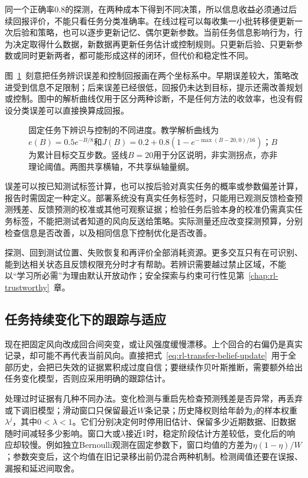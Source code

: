 同一个正确率$0.8$的探测，在两种成本下得到不同决策，所以信息收益必须通过后续回报评价，不能只看任务分类准确率。在线过程可以每收集一小批转移便更新一次后验和策略，也可以逐步更新记忆、偶尔更新参数。当前任务信息影响行为，行为决定取得什么数据，新数据再更新任务估计或控制规则。只更新后验、只更新参数或同时更新两者，都可能形成这样的闭环，但代价和稳定性不同。

图~\ref{fig:rl-transfer-identification-curves}~刻意把任务辨识误差和控制回报画在两个坐标系中。早期误差较大，策略改进受到信息不足限制；后来误差已经很低，回报仍未达到目标，提示还需改善规划或控制。图中的解析曲线仅用于区分两种诊断，不是任何方法的收敛率，也没有假设分类误差可以直接换算成回报。

\begin{figure}[htbp]
 \centering
 
 \caption{固定任务下辨识与控制的不同进度。教学解析曲线为$e(B)=0.5e^{-B/8}$和$J(B)=0.2+0.8(1-e^{-\max(B-20,0)/16})$；$B$为累计目标交互步数。竖线$B=20$用于分区说明，非实测拐点，亦非理论阈值。两图共享横轴，不共享纵轴量纲。}
 \label{fig:rl-transfer-identification-curves}
\end{figure}

误差可以按已知测试标签计算，也可以按后验对真实任务的概率或参数偏差计算，报告时需固定一种定义。部署系统没有真实任务标签时，只能用已观测反馈检查预测残差、反馈预测的校准或其他可观察证据；检验任务后验本身的校准仍需真实任务标签，不能把测试者知道的风向反送给策略。实际测量还应改变探测预算，分别检查信息是否改善，以及相同信息下控制优化是否改善。

探测、回到测试位置、失败恢复和再评价全部消耗资源。更多交互只有在可识别、能到达相关状态且反馈权限充分时才有帮助。若辨识需要越过禁止区域，不能以“学习所必需”为理由默认开放动作；安全探索与约束可行性见第~\ref{chap:rl-trustworthy}~章。

\subsection{任务持续变化下的跟踪与适应}
\label{sec:rl-transfer-tracking}

现在把固定风向改成回合间突变，或让风强度缓慢漂移。上个回合的右偏仍是真实记录，却可能不再代表当前风向。直接把式~\eqref{eq:rl-transfer-belief-update}~用于全部历史，会把已失效的证据累积成过度自信；要继续作贝叶斯推断，需要额外给出任务变化模型，否则应采用明确的跟踪估计。

处理过时证据有几种不同办法。变化检测与重启先检查预测残差是否异常，再丢弃或下调旧模型；滑动窗口只保留最近$W$条记录；历史降权则给年龄为$j$的样本权重$\lambda^j$，其中$0<\lambda<1$。它们分别决定何时停用旧估计、保留多少近期数据、旧数据随时间减轻多少影响。窗口大或$\lambda$接近1时，稳定阶段估计方差较低，变化后的响应却较慢。例如独立Bernoulli观测在固定参数下，窗口均值的方差为$\eta(1-\eta)/W$；参数突变后，这个均值在旧记录移出前仍混合两种机制。检测阈值还要在误报、漏报和延迟间取舍。

